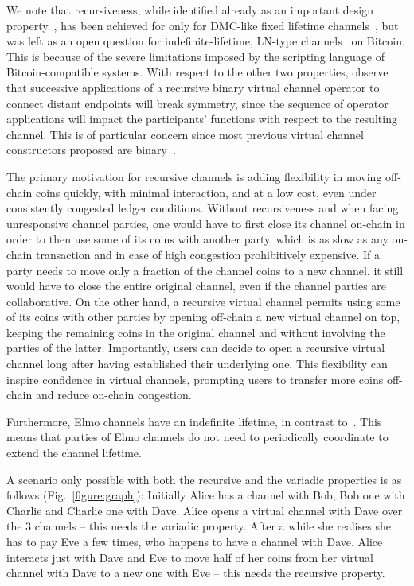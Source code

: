 We note that recursiveness, while identified already as an important design
property~\cite{DBLP:conf/ccs/DziembowskiFH18}, has been achieved for only for
DMC-like fixed lifetime channels~\cite{10.1007/978-3-030-65411-5_18}, but was
left as an open question for indefinite-lifetime, LN-type
channels~\cite{9519487} on Bitcoin.
This is because of the severe limitations imposed by the scripting language of Bitcoin-compatible systems.
With respect to the other two properties, observe that successive applications
of a recursive binary virtual channel operator to connect distant endpoints will
break symmetry, since the sequence of operator applications will impact the
participants' functions with respect to the resulting channel. This is of
particular concern since most previous virtual channel constructors proposed are
binary~\cite{DBLP:conf/ccs/DziembowskiFH18,9519487,10.1007/978-3-030-65411-5_18}.

The primary motivation for recursive channels is adding flexibility in
moving off-chain coins quickly, with minimal interaction, and at a low cost, even
under consistently
congested ledger conditions. Without recursiveness and when facing
unresponsive channel parties, one would have to first
close its channel on-chain in order to then use some of its coins with
another party, which is as slow as any on-chain transaction and in case of high
congestion prohibitively expensive. If a party needs to move only a
fraction of the channel coins to a new channel, it still would have to close the
entire original channel, even if the channel parties are collaborative.
On the other hand, a
recursive
virtual channel permits using some of its coins with other parties by
opening off-chain a new virtual channel on top, keeping the remaining coins in
the original channel and without involving the parties of
the latter. Importantly, users can decide to open a recursive virtual channel
long after having established their underlying one. This flexibility can inspire confidence in virtual
channels, prompting users to transfer more coins off-chain and
reduce on-chain congestion.

Furthermore, Elmo channels have an indefinite lifetime, in contrast
to~\cite{donner}. This means that parties of Elmo channels do not need to
periodically coordinate to extend the channel lifetime.

A scenario only possible with both the recursive and the variadic
properties is as follows (Fig.~\ref{figure:graph}): Initially Alice has a channel with
Bob, Bob one with Charlie and Charlie one with Dave. Alice opens a virtual
channel with Dave over the $3$ channels -- this needs the variadic property.
After a while she realises she has to pay Eve a few
times, who happens to have a channel with Dave. Alice interacts just with
Dave and Eve to move half of her coins from her virtual channel with Dave to a
new one with Eve -- this needs the recursive property.

